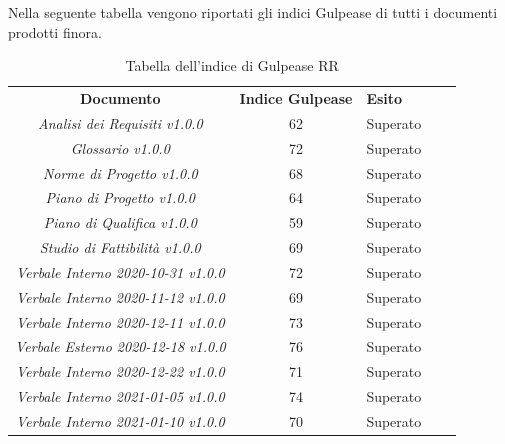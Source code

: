Nella seguente tabella vengono riportati gli indici Gulpease\glo{} di tutti
i documenti prodotti finora.
\renewcommand{\arraystretch}{1.5}
\begin{longtable}{ c c  C{4cm}  c  c }
    \caption{Tabella dell'indice di Gulpease RR} \\
    \rowcolor{\primaryColor}
    \textcolor{\secondaryColor}{
    \centering\textbf{Documento}}     & \textcolor{\secondaryColor}{\centering\textbf{Indice Gulpease}}    & \textcolor{\secondaryColor}
    {\centering\textbf{Esito}} \\
    \textit{Analisi dei Requisiti v1.0.0}           & 62                                    & Superato{} \\
    \textit{Glossario v1.0.0}                       & 72                                    & Superato{} \\
    \textit{Norme di Progetto v1.0.0}               & 68                                   & Superato{} \\
    \textit{Piano di Progetto v1.0.0}                & 64                                    & Superato{} \\
    \textit{Piano di Qualifica v1.0.0}                & 59                                    & Superato{} \\
    \textit{Studio di Fattibilità v1.0.0}               & 69                                    & Superato{} \\
    \textit{Verbale Interno 2020-10-31 v1.0.0}          & 72                                    & Superato{} \\
    \textit{Verbale Interno 2020-11-12 v1.0.0}          & 69                                    & Superato{} \\
    \textit{Verbale Interno 2020-12-11 v1.0.0}          & 73                                    & Superato{} \\
    \textit{Verbale Esterno 2020-12-18 v1.0.0}          & 76                                    & Superato{} \\
    \textit{Verbale Interno 2020-12-22 v1.0.0}          & 71                                    & Superato{} \\
    \textit{Verbale Interno 2021-01-05 v1.0.0}          & 74                                    & Superato{} \\
    \textit{Verbale Interno 2021-01-10 v1.0.0}          & 70                                    & Superato{} \\

\end{longtable}

